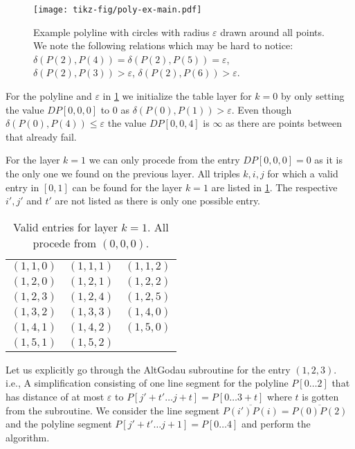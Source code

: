 \begin{figure}
  \centering
  \texttt{[image: tikz-fig/poly-ex-main.pdf]}
  \caption{Example polyline with circles with radius \(\varepsilon\) drawn around all points. We note the following relations which may be hard to notice: \(\delta(P(2), P(4)) = \delta(P(2), P(5)) = \varepsilon\), \(\delta(P(2), P(3)) > \varepsilon\), \(\delta(P(2), P(6)) > \varepsilon\).}
  \label{fig:poly-ex-main}
\end{figure}

For the polyline and \(\varepsilon\) in \cref{fig:poly-ex-main} we initialize the table layer for \(k = 0\) by only setting the value \(DP[0,0,0]\) to \(0\) as \(\delta(P(0), P(1)) > \varepsilon\). Even though \(\delta(P(0), P(4)) \leq \varepsilon\) the value \(DP[0,0,4]\) is \(\infty\) as there are points between that already fail.

For the layer \(k = 1\) we can only procede from the entry \(DP[0,0,0] = 0\) as it is the only one we found on the previous layer. All triples \(k, i, j\) for which a valid entry in \([0, 1]\) can be found for the layer \(k = 1\) are listed in \cref{tab:exlayer1}. The respective \(i', j'\) and \(t'\) are not listed as there is only one possible entry.
\begin{table}[ht]
\centering
\begin{tabular}{|ccc|}
\hline
$(1,1,0)$ & $(1,1,1)$ & $(1,1,2)$ \\
$(1,2,0)$ & $(1,2,1)$ & $(1,2,2)$ \\
$(1,2,3)$ & $(1,2,4)$ & $(1,2,5)$ \\
$(1,3,2)$ & $(1,3,3)$ & $(1,4,0)$ \\
$(1,4,1)$ & $(1,4,2)$ & $(1,5,0)$ \\
$(1,5,1)$ & $(1,5,2)$ & \\
\hline
\end{tabular}
\caption{Valid entries for layer \(k = 1\). All procede from \((0,0,0)\).}
\label{tab:exlayer1}
\end{table}

Let us explicitly go through the AltGodau subroutine for the entry \((1, 2, 3)\). i.e., A simplification consisting of one line segment for the polyline \(P[0\dots 2]\) that has distance of at most \(\varepsilon\) to \(P[j' + t'\dots j + t] = P[0 \dots 3 + t]\) where \(t\) is gotten from the subroutine. We consider the line segment \(\overline{P(i')P(i)} = \overline{P(0)P(2)}\) and the polyline segment \(P[j' + t' \dots j + 1] = P[0 \dots 4]\) and perform the algorithm. 

